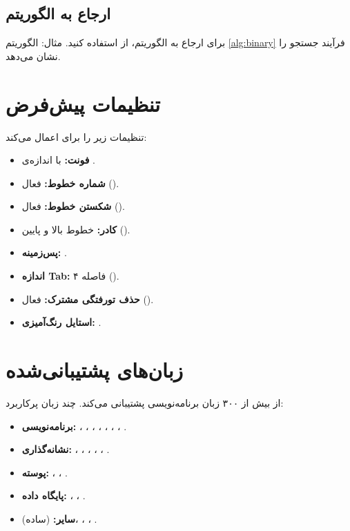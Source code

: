 \subsection{ارجاع به الگوریتم}
\label{sec:code-algorithm-reference}

برای ارجاع به الگوریتم، از  استفاده
کنید. مثال: الگوریتم \cref{alg:binary} فرآیند
جستجو را نشان می‌دهد.


\section{تنظیمات پیش‌فرض }
\label{sec:code-settings}

 تنظیمات زیر را برای 
اعمال می‌کند:

\begin{itemize}
    \item \textbf{فونت:}  با
    اندازه‌ی .
    \item \textbf{شماره خطوط:} فعال
    ().
    \item \textbf{شکستن خطوط:} فعال
    ().
    \item \textbf{کادر:} خطوط بالا و پایین
    ().
    \item \textbf{پس‌زمینه:} .
    \item \textbf{اندازه Tab:} ۴ فاصله
    ().
    \item \textbf{حذف تورفتگی مشترک:} فعال
    ().
    \item \textbf{استایل رنگ‌آمیزی:} .
\end{itemize}


\section{زبان‌های پشتیبانی‌شده}
\label{sec:code-languages}

 از بیش از ۳۰۰ زبان برنامه‌نویسی
پشتیبانی می‌کند. چند زبان پرکاربرد:

\begin{itemize}
    \item \textbf{برنامه‌نویسی:} ،
    ، ، ،
    ، ،
    ، .
    \item \textbf{نشانه‌گذاری:} ،
    ، ، ،
    ، .
    \item \textbf{پوسته:} ، ،
    .
    \item \textbf{پایگاه داده:} ،
    ، .
    \item \textbf{سایر:}  (ساده)،
    ، ، .
\end{itemize}


